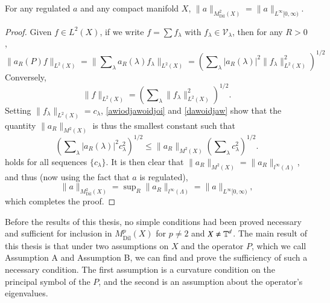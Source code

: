 \begin{lemma} \label{L2M2Lemma}
  For any regulated $a$ and any compact manifold $X$, $\| a \|_{M^2_{\text{Dil}}(X)} = \| a \|_{L^\infty[0,\infty)}$.
\end{lemma}
\begin{proof}
  Given $f \in L^2(X)$, if we write $f = \sum f_\lambda$ with $f_\lambda \in \mathcal{V}_\lambda$, then for any $R > 0$,
  \begin{equation} \label{awiodjawoidjoi}
    \| a_R(P) f \|_{L^2(X)} = \big\| \sum\nolimits_\lambda a_R(\lambda) f_\lambda \big\|_{L^2(X)} = \left( \sum\nolimits_\lambda |a_R(\lambda)|^2 \| f_\lambda \|_{L^2(X)}^2 \right)^{1/2}
  \end{equation}
  Conversely,
  \begin{equation} \label{dawoidjaw}
    \| f \|_{L^2(X)} = \left( \sum\nolimits_\lambda \| f_\lambda \|_{L^2(X)}^2 \right)^{1/2}.
  \end{equation}
  Setting $\| f_\lambda \|_{L^2(X)} = c_\lambda$, \eqref{awiodjawoidjoi} and \eqref{dawoidjaw} show that the quantity $\| a_R \|_{M^2(X)}$ is thus the smallest constant such that
  \begin{equation}
    \left( \sum\nolimits_\lambda |a_R(\lambda)|^2 c_\lambda^2 \right)^{1/2} \leq \| a_R \|_{M^2(X)} \left( \sum\nolimits_\lambda c_\lambda^2 \right)^{1/2}.
  \end{equation}
  holds for all sequences $\{ c_\lambda \}$. It is then clear that $\| a_R \|_{M^2(X)} = \| a_R \|_{l^\infty(\Lambda)}$, and thus (now using the fact that $a$ is regulated),
  \begin{equation}
    \| a \|_{M^2_{\text{Dil}}(X)} = \sup\nolimits_R \| a_R \|_{l^\infty(\Lambda)} = \| a \|_{L^\infty[0,\infty)},
  \end{equation}
  which completes the proof.
\end{proof}

Before the results of this thesis, no simple conditions had been proved necessary and sufficient for inclusion in $M^p_{\text{Dil}}(X)$ for $p \neq 2$ and $X \neq \operatorname{\mathbb{T}}^d$. The main result of this thesis is that under two assumptions on $X$ and the operator $P$, which we call Assumption A and Assumption B, we can find and prove the sufficiency of such a necessary condition. The first assumption is a curvature condition on the principal symbol of the $P$, and the second is an assumption about the operator's eigenvalues.

\vspace{0.5em}
\noindent {}

